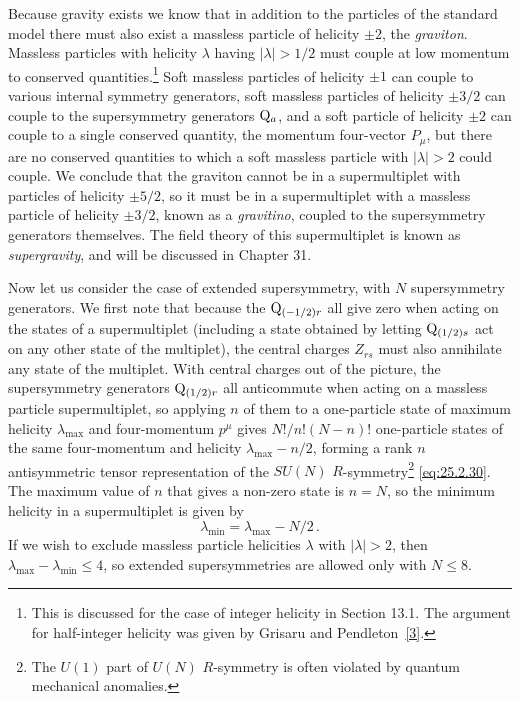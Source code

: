 Because gravity exists we know that in addition to the particles of the
standard model there must also exist a massless particle of helicity $\pm2$,
the \emph{graviton}. Massless particles with helicity $\lambda$ having
$|\lambda|>1/2$ must couple at low momentum to conserved
quantities.\footnote{This is discussed for the case of integer helicity in
Section 13.1. The argument for half-integer helicity was given by Grisaru and
Pendleton~\hyperref[ch25-ref-3]{[3]}.} Soft massless particles of helicity
$\pm1$ can couple to various internal symmetry generators, soft massless
particles of helicity $\pm3/2$ can couple to the supersymmetry generators
$\mathrm{Q}_a$, and a soft particle of helicity $\pm2$ can couple to a single
conserved quantity, the momentum four-vector $P_\mu$, but there are no
conserved quantities to which a soft massless particle with $|\lambda|>2$
could couple. We conclude that the graviton cannot be in a supermultiplet with
particles of helicity $\pm5/2$, so it must be in a supermultiplet with a
massless particle of helicity $\pm3/2$, known as a \emph{gravitino}, coupled
to the supersymmetry generators themselves. The field theory of this
supermultiplet is known as \emph{supergravity}, and will be discussed in
Chapter 31.

Now let us consider the case of extended supersymmetry, with $N$
supersymmetry generators. We first note that because the
$\mathrm{Q}_{(-1/2)r}$ all give zero when acting on the states of a
supermultiplet (including a state obtained by letting $\mathrm{Q}_{(1/2)s}$ act on
any other state of the multiplet), the central charges $Z_{rs}$ must also
annihilate any state of the multiplet. With central charges out of the
picture, the supersymmetry generators $\mathrm{Q}_{(1/2)r}$ all anticommute when
acting on a massless particle supermultiplet, so applying $n$ of them to a
one-particle state of maximum helicity $\lambda_{\max}$ and four-momentum
$p^\mu$ gives $N!/n!(N-n)!$ one-particle states of the same four-momentum
and helicity $\lambda_{\max}-n/2$, forming a rank $n$ antisymmetric tensor
representation of the $SU(N)$ $R$-symmetry\footnote{The $U(1)$ part of
$U(N)$ $R$-symmetry is often violated by quantum mechanical anomalies.}
\eqref{eq:25.2.30}. The maximum value of $n$ that gives a non-zero state is
$n=N$, so the minimum helicity in a supermultiplet is given by
\begin{equation}
  \lambda_{\min}=\lambda_{\max}-N/2\,.
  \tag{25.4.9}\label{eq:25.4.9}
\end{equation}
If we wish to exclude massless particle helicities $\lambda$ with
$|\lambda|>2$, then $\lambda_{\max}-\lambda_{\min}\leq4$, so extended
supersymmetries are allowed only with $N\leq8$.

